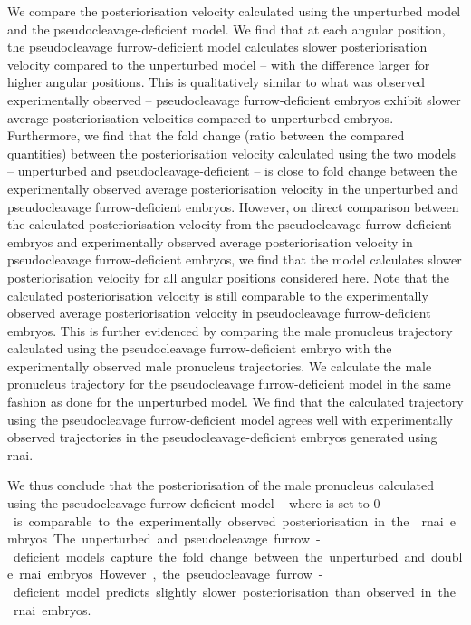 We compare the posteriorisation velocity calculated using the unperturbed model and the pseudocleavage-deficient model. We find that at each angular position, the pseudocleavage furrow-deficient model calculates slower posteriorisation velocity compared to the unperturbed model -- with the difference larger for higher angular positions. This is qualitatively similar to what was observed experimentally observed -- pseudocleavage furrow-deficient embryos exhibit slower average posteriorisation velocities compared to unperturbed embryos. Furthermore, we find that the fold change (ratio between the compared quantities) between the posteriorisation velocity calculated using the two models -- unperturbed and pseudocleavage-deficient -- is close to fold change between the experimentally observed average posteriorisation velocity in the unperturbed and pseudocleavage furrow-deficient embryos. However, on direct comparison between the calculated posteriorisation velocity from the pseudocleavage furrow-deficient embryos and experimentally observed average posteriorisation velocity in pseudocleavage furrow-deficient embryos, we find that the model calculates slower posteriorisation velocity for all angular positions considered here. Note that the calculated posteriorisation velocity is still comparable to the experimentally observed average posteriorisation velocity in pseudocleavage furrow-deficient embryos. This is further evidenced by comparing the male pronucleus trajectory calculated using the pseudocleavage furrow-deficient embryo with the experimentally observed male pronucleus trajectories. We calculate the male pronucleus trajectory for the pseudocleavage furrow-deficient model in the same fashion as done for the unperturbed model. We find that the calculated trajectory using the pseudocleavage furrow-deficient model agrees well with experimentally observed trajectories in the pseudocleavage-deficient embryos generated using  \ac{rnai}.

We thus conclude that the posteriorisation of the male pronucleus calculated using the pseudocleavage furrow-deficient model -- where \nematicLength is set to \SI{0}{\square\unitLength\per\second} -- is comparable to the experimentally observed posteriorisation in the  \ac{rnai} embryos. The unperturbed and pseudocleavage furrow-deficient models capture the fold change between the unperturbed and double \ac{rnai} embryos. However, the pseudocleavage furrow-deficient model predicts slightly slower posteriorisation than observed in the  \ac{rnai} embryos.

